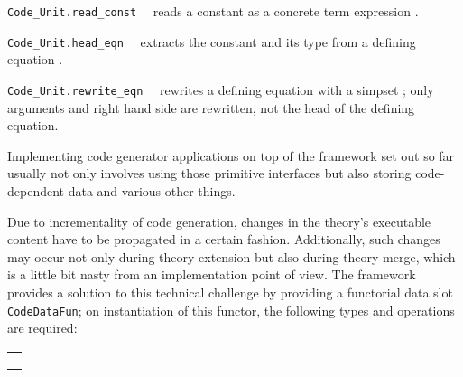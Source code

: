 \begin{isabellebody}
\begin{isamarkuptext}
  \begin{description}

  \item \verb|Code_Unit.read_const|~~
     reads a constant as a concrete term expression .

  \item \verb|Code_Unit.head_eqn|~~
     extracts the constant and its type from a defining equation .

  \item \verb|Code_Unit.rewrite_eqn|~~
     rewrites a defining equation  with a simpset ;
     only arguments and right hand side are rewritten,
     not the head of the defining equation.

  \end{description}%
\end{isamarkuptext}%
\isamarkuptrue%
%
\endisatagmlref
{\isafoldmlref}%
%
\isadelimmlref
%
\endisadelimmlref
%
\isamarkuptrue%
%
\begin{isamarkuptext}%
Implementing code generator applications on top
  of the framework set out so far usually not only
  involves using those primitive interfaces
  but also storing code-dependent data and various
  other things.%
\end{isamarkuptext}%
\isamarkuptrue%
%
\isamarkuptrue%
%
\begin{isamarkuptext}%
Due to incrementality of code generation, changes in the
  theory's executable content have to be propagated in a
  certain fashion.  Additionally, such changes may occur
  not only during theory extension but also during theory
  merge, which is a little bit nasty from an implementation
  point of view.  The framework provides a solution
  to this technical challenge by providing a functorial
  data slot \verb|CodeDataFun|; on instantiation
  of this functor, the following types and operations
  are required:

  \medskip
  \begin{tabular}{l}
  \isa{type\ T} \\
  \isa{val\ empty{\isacharcolon}\ T} \\
  \isa{val\ purge{\isacharcolon}\ theory\ {\isasymrightarrow}\ CodeUnit{\isachardot}const\ list\ option\ {\isasymrightarrow}\ T\ {\isasymrightarrow}\ T}
  \end{tabular}


\end{isamarkuptext}
\end{isabellebody}
